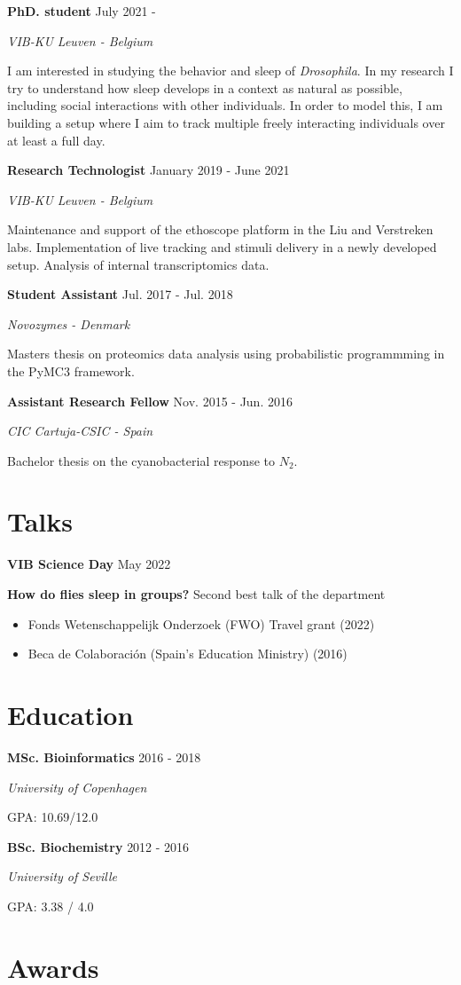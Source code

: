\documentclass[paper=a4,fontsize=11pt]{article}
\newcommand{\NewPart}[1]{
\vspace{-15pt}
\section*{
{#1}}}
\newcommand{\Entry}[4]{
		\noindent \textbf{#1} \hfill      %
		{\color{gray}\textsf{#2}} \par                  %
		\noindent \textit{#3} \par        %
		  \noindent \small #4  %
		\normalsize \par \vspace{7.5pt}}
\newcommand{\ShortEntry}[4]{
		\noindent \textbf{#1} \hfill      %
		{\color{gray}\textsf{#2}} \par                  %
		  \noindent \small #3  %
		\normalsize \par \vspace{7.5pt}}
\begin{document}
\Entry{PhD. student}{July 2021 - }{VIB-KU Leuven - Belgium}{
I am interested in studying the behavior and sleep of \textit{Drosophila}. In my research I try to understand how sleep develops in a context as natural as possible, including social interactions with other individuals. In order to model this, I am building a setup where I aim to track multiple freely interacting individuals over at least a full day.
}

\Entry{Research Technologist}{January 2019 - June 2021}{VIB-KU Leuven - Belgium}{
Maintenance and support of the ethoscope platform in the Liu and Verstreken labs. Implementation of live tracking and stimuli delivery in a newly developed setup. Analysis of internal transcriptomics data.
}


\Entry{Student Assistant}{Jul. 2017 - Jul. 2018}{Novozymes - Denmark}{Master\textquotesingle s thesis on proteomics data analysis using probabilistic programmming in the PyMC3 framework.}


\Entry{Assistant Research Fellow}{Nov. 2015 - Jun. 2016}{CIC Cartuja-CSIC  - Spain}{Bachelor thesis on the cyanobacterial response to $N_2$.}


\NewPart{Talks}

\ShortEntry{VIB Science Day}{May 2022}{\textbf{How do flies sleep in groups?} Second best talk of the department}



\NewPart{Grants \& Fellowships}

\begin{itemize}
\item Fonds Wetenschappelijk Onderzoek (FWO) Travel grant (2022)
\item Beca de Colaboraci\'on (Spain's Education Ministry) (2016)
\end{itemize}


\NewPart{Education}

\Entry{MSc. Bioinformatics}{2016 - 2018}{University of Copenhagen}{GPA: 10.69/12.0}
\Entry{BSc. Biochemistry}{2012 - 2016}{University of Seville}{GPA: 3.38 / 4.0}


\thispagestyle{plain}

\NewPart{Awards}
\end{document}

